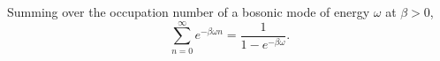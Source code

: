 \documentclass{article}
\begin{document}
Summing over the occupation number of a bosonic mode of energy $\omega$ at $\beta>0$,
\begin{equation}
\sum_{n=0}^{\infty} e^{-\beta\omega n} = \frac{1}{1-e^{-\beta\omega}} .
\label{eq:g}
\end{equation}
\end{document}
